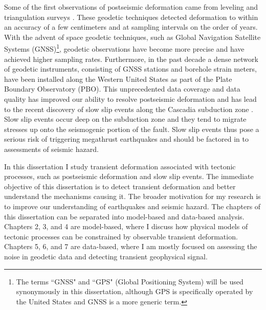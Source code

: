 Some of the first observations of postseismic deformation came from
leveling and triangulation surveys
\citep[e.g,][]{Kanamori1973,Thatcher1975}. These geodetic techniques
detected deformation to within an accuracy of a few centimeters and at
sampling intervals on the order of years. With the advent of space
geodetic techniques, such as Global Navigation Satellite Systems
(GNSS)\footnote{The terms ``GNSS" and ``GPS" (Global Positioning
System) will be used synonymously in this dissertation, although GPS
is specifically operated by the United States and GNSS is a more
generic term.}, geodetic observations have become more precise and
have achieved higher sampling rates. Furthermore, in the past decade a
dense network of geodetic instruments, consisting of GNSS stations and
borehole strain meters, have been installed along the Western United
States as part of the Plate Boundary Observatory (PBO). This
unprecedented data coverage and data quality has improved our ability
to resolve postseismic deformation and has lead to the recent
discovery of slow slip events along the Cascadia subduction zone
\citep{Dragert2001}. Slow slip events occur deep on the subduction
zone and they tend to migrate stresses up onto the seismogenic portion
of the fault. Slow slip events thus pose a serious risk of triggering
megathrust earthquakes and should be factored in to assessments of
seismic hazard.

In this dissertation I study transient deformation associated with
tectonic processes, such as postseismic deformation and slow slip
events. The immediate objective of this dissertation is to detect
transient deformation and better understand the mechanisms causing it.
The broader motivation for my research is to improve our understanding
of earthquakes and seismic hazard. The chapters of this dissertation
can be separated into model-based and data-based analysis. Chapters 2,
3, and 4 are model-based, where I discuss how physical models of
tectonic processes can be constrained by observable transient
deformation. Chapters 5, 6, and 7 are data-based, where I am mostly
focused on assessing the noise in geodetic data and detecting
transient geophysical signal.

